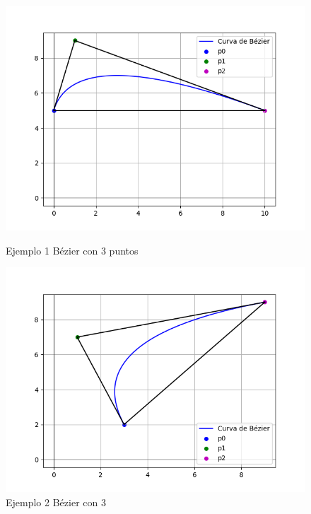 \documentclass{article}
\begin{document}
\begin{figure}[H]
   \centering
    \begin{minipage}{0.45\textwidth}
        \centering
        \includegraphics[width=\textwidth]{imagenes/3b1.png}
        \caption{Ejemplo 1 Bézier con 3 puntos}
        \label{fig:grafico1}
    \end{minipage}
    \hfill
    \begin{minipage}{0.45\textwidth}
        \centering
        \includegraphics[width=\textwidth]{imagenes/3b2.png}
        \caption{Ejemplo 2 Bézier con 3}
        \label{fig:grafico2}
    \end{minipage}
\begin{minipage}{0.45\textwidth}
        \centering

\end{minipage}
\end{figure}
\end{document}
